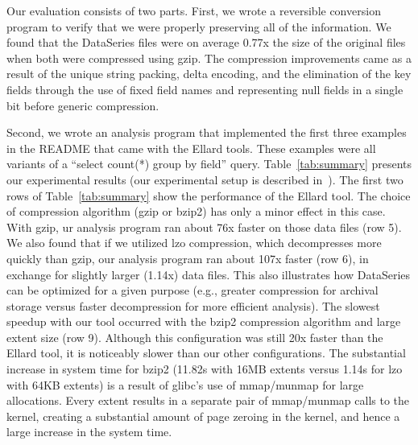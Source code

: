 \documentclass{acm_proc_article-sp}
\begin{document}
Our evaluation consists of two parts.
First, we wrote a reversible conversion program to
verify that we were properly preserving all of the information.
We found that the DataSeries files were on average 0.77x the size of
the original files when both were compressed using gzip.  The
compression improvements came as a result of the unique string
packing, delta encoding, and the elimination of the key fields through
the use of fixed field names and representing null fields in a single
bit before generic compression.


Second, we
wrote an analysis program that implemented the first three examples in
the README that came with the Ellard tools.  
These examples were
all variants of a ``select count(*) group by field'' query.
Table~\ref{tab:summary} presents our experimental results
(our experimental setup 
is described in~\cite{DSTechnicalReportSnapshot}).
The first two rows of Table~\ref{tab:summary} show the performance
of the Ellard tool.  The choice of compression algorithm (gzip or bzip2)
has only a minor effect in this case.
With gzip, ur analysis program ran about 76x faster on those data files 
(row 5).
We also found that
if we utilized lzo compression, which decompresses more quickly than
gzip, our analysis program ran about 107x faster (row 6), in exchange for
slightly larger (1.14x) data files.  This also illustrates how
DataSeries can be optimized for a given purpose (e.g., greater
compression for archival storage versus faster decompression for more
efficient analysis). 
The slowest speedup with our tool occurred with the bzip2 compression
algorithm and large extent size (row 9).
Although this configuration was still 20x faster than the Ellard tool,
it is noticeably slower than our other configurations.  The substantial
increase in system time for bzip2 (11.82s with 16MB extents versus
1.14s for lzo with 64KB extents) is a result of glibc's use of
mmap/munmap
for large allocations.  Every extent results in a separate pair of
mmap/munmap calls to the kernel, creating a substantial amount of page
zeroing in the kernel, and hence a large increase in the system time. 
\end{document}

